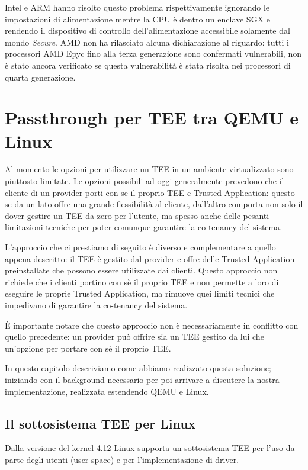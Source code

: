 \documentclass[12pt,italian]{report}
\begin{document}
Intel e ARM hanno risolto questo problema rispettivamente ignorando le
impostazioni di alimentazione mentre la CPU è dentro un enclave SGX e
rendendo il dispositivo di controllo dell'alimentazione accessibile
solamente dal mondo \textit{Secure}.
AMD non ha rilasciato alcuna dichiarazione al riguardo: tutti i processori
AMD Epyc fino alla terza generazione sono confermati vulnerabili, non è
stato ancora verificato se questa vulnerabilità è stata risolta nei
processori di quarta generazione.  

\chapter{Passthrough per TEE tra QEMU e Linux}
\label{chap:passthrough-tee-qemu-linux}
Al momento le opzioni per utilizzare un TEE in un ambiente virtualizzato
sono piuttosto limitate.
Le opzioni possibili ad oggi generalmente prevedono che il cliente di un
provider porti con se il proprio TEE e Trusted Application:
questo se da un lato offre una grande flessibilità al cliente, dall'altro
comporta non solo il dover gestire un TEE da zero per l'utente, ma spesso
anche delle pesanti limitazioni tecniche per poter comunque garantire la
co-tenancy del sistema.

L'approccio che ci prestiamo di seguito è diverso e complementare a quello
appena descritto: il TEE è gestito dal provider e offre delle Trusted
Application preinstallate che possono essere utilizzate dai clienti.
Questo approccio non richiede che i clienti portino con sè il proprio TEE
e non permette a loro di eseguire le proprie Trusted Application, ma rimuove
quei limiti tecnici che impedivano di garantire la co-tenancy del sistema.

È importante notare che questo approccio non è necessariamente in conflitto
con quello precedente: un provider può offrire sia un TEE gestito da lui
che un'opzione per portare con sè il proprio TEE.

\bigbreak \noindent

In questo capitolo descriviamo come abbiamo realizzato questa soluzione;
iniziando con il background necessario per poi arrivare a discutere la nostra
implementazione, realizzata estendendo QEMU e Linux.

\section{Il sottosistema TEE per Linux}
\label{sec:sottosistema-tee-per-linux}
Dalla versione del kernel 4.12 Linux supporta un sottosistema TEE
\cite{linux_tee_subsystem}
per l'uso da parte degli utenti (user space) e per l'implementazione
di driver.
\end{document}
